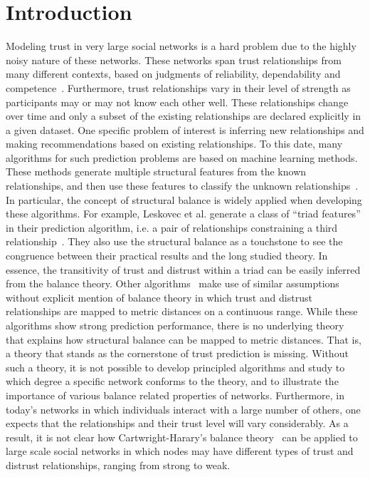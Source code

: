 \documentclass[acmtweb]{acmsmall}
\begin{document}
\section{Introduction}
Modeling trust in very large social networks is a hard problem due to
the highly noisy nature of these networks. These networks span trust
relationships from many different contexts, based on judgments of
reliability, dependability and
competence~\cite{Adali:2013}. Furthermore, trust relationships vary in
their level of strength as participants may or may not know each other
well. These relationships change over time and only a subset of the
existing relationships are declared explicitly in a given dataset.
One specific problem of interest is inferring new relationships and
making recommendations based on existing relationships. To this date,
many algorithms for such prediction problems are based on machine
learning methods. These methods generate multiple structural features
from the known relationships, and then use these features to classify
the unknown
relationships~\cite{golbeck:distrust2011}\cite{Guha:04}\cite{Leskovec:2010}. In
particular, the concept of structural balance is widely applied when
developing these algorithms. For example, Leskovec et al. generate a
class of ``triad features'' in their prediction algorithm, i.e. a pair
of relationships constraining a third
relationship~\cite{Leskovec:2010}. They also use the structural
balance as a touchstone to see the congruence between their practical
results and the long studied theory. In essence, the transitivity of
trust and distrust within a triad can be easily inferred from the
balance theory. Other algorithms~\cite{golbeck:distrust2011} make use
of similar assumptions without explicit mention of balance theory in
which trust and distrust relationships are mapped to metric distances
on a continuous range. While these algorithms show strong prediction
performance, there is no underlying theory that explains how
structural balance can be mapped to metric distances. That is, a
theory that stands as the cornerstone of trust prediction is
missing. Without such a theory, it is not possible to develop
principled algorithms and study to which degree a specific network
conforms to the theory, and to illustrate the importance of various
balance related properties of networks. Furthermore, in today's
networks in which individuals interact with a large number of others,
one expects that the relationships and their trust level will vary
considerably. As a result, it is not clear how Cartwright-Harary's
balance theory~\cite{Cartwright:56} can be applied to large scale
social networks in which nodes may have different types of trust and
distrust relationships, ranging from strong to weak.
\end{document}
